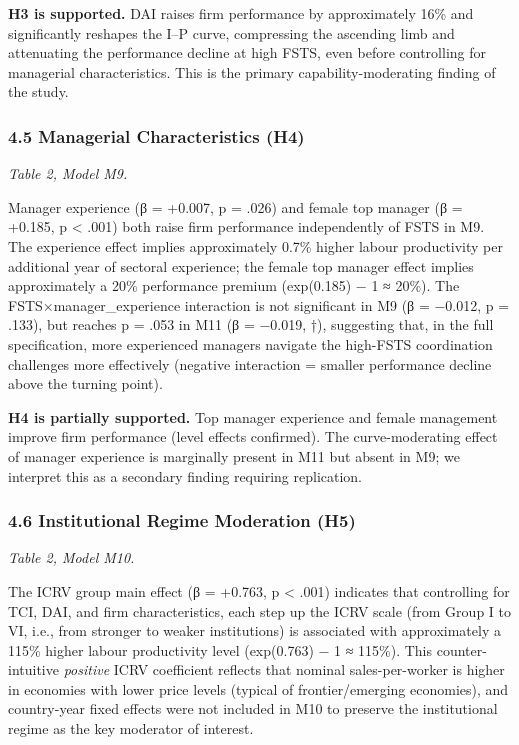 \documentclass[
  12pt,a4paper]{article}
\begin{document}
\textbf{H3 is supported.} DAI raises firm performance by approximately
16\% and significantly reshapes the I--P curve, compressing the
ascending limb and attenuating the performance decline at high FSTS,
even before controlling for managerial characteristics. This is the
primary capability-moderating finding of the study.

\hypertarget{managerial-characteristics-h4-1}{%
\subsubsection{4.5 Managerial Characteristics
(H4)}\label{managerial-characteristics-h4-1}}

\emph{Table 2, Model M9.}

Manager experience (β = +0.007, p = .026) and female top manager (β =
+0.185, p \textless{} .001) both raise firm performance independently of
FSTS in M9. The experience effect implies approximately 0.7\% higher
labour productivity per additional year of sectoral experience; the
female top manager effect implies approximately a 20\% performance
premium (exp(0.185) − 1 ≈ 20\%). The FSTS×manager\_experience
interaction is not significant in M9 (β = −0.012, p = .133), but reaches
p = .053 in M11 (β = −0.019, †), suggesting that, in the full
specification, more experienced managers navigate the high-FSTS
coordination challenges more effectively (negative interaction = smaller
performance decline above the turning point).

\textbf{H4 is partially supported.} Top manager experience and female
management improve firm performance (level effects confirmed). The
curve-moderating effect of manager experience is marginally present in
M11 but absent in M9; we interpret this as a secondary finding requiring
replication.

\hypertarget{institutional-regime-moderation-h5}{%
\subsubsection{4.6 Institutional Regime Moderation
(H5)}\label{institutional-regime-moderation-h5}}

\emph{Table 2, Model M10.}

The ICRV group main effect (β = +0.763, p \textless{} .001) indicates
that controlling for TCI, DAI, and firm characteristics, each step up
the ICRV scale (from Group I to VI, i.e., from stronger to weaker
institutions) is associated with approximately a 115\% higher labour
productivity level (exp(0.763) − 1 ≈ 115\%). This counter-intuitive
\emph{positive} ICRV coefficient reflects that nominal sales-per-worker
is higher in economies with lower price levels (typical of
frontier/emerging economies), and country-year fixed effects were not
included in M10 to preserve the institutional regime as the key
moderator of interest.
\end{document}
